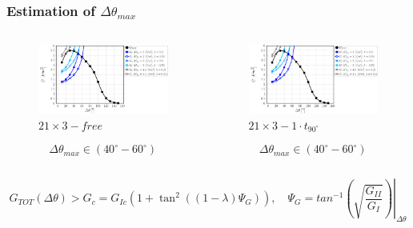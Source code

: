 \documentclass[first,firstsupp,lastsupp,last,hyperref,table]{ETHclass}
\begin{document}
\addtocounter{framenumber}{-1}

\begin{frame}
\frametitle{\vspace{0.2cm}\small Estimation of $\Delta\theta_{max}$}
\vspace{-1.25cm}
\centering
\begin{columns}[c]
\centering
\begin{column}{0.5\textwidth}
\centering
\begin{figure}
\centering
\caption{\scriptsize $21\times 3-free$}
\includegraphics[width=\columnwidth]{vf60-dsize-S10A3.pdf}
\end{figure}
\scriptsize
\begin{equation*}
\Delta\theta_{max}\in\left(40^{\circ}-60^{\circ}\right)
\end{equation*}
\end{column}
\begin{column}{0.5\textwidth}
\centering
\begin{figure}
\centering
\caption{\scriptsize$21\times 3-1\cdot t_{90^{\circ}}$}
\includegraphics[width=\columnwidth]{vf60-dsize-S10A3T1.pdf}
\end{figure}
\scriptsize
\begin{equation*}
\Delta\theta_{max}\in\left(40^{\circ}-60^{\circ}\right)
\end{equation*}
\end{column}
\end{columns}
\scriptsize
\vspace{0.25cm}
\begin{equation*}
G_{TOT}\left(\Delta\theta\right)>G_{c}=G_{Ic}\left(1+\tan^{2}\left(\left(1-\lambda\right)\Psi_{G}\right)\right),\quad\Psi_{G}=\left.tan^{-1}\left(\sqrt{\frac{G_{II}}{G_{I}}}\right)\right|_{\Delta\theta}
\end{equation*}
\end{frame}
\end{document}
